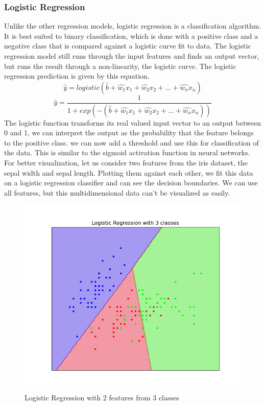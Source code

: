 \documentclass{article}
\begin{document}
\subsubsection{Logistic Regression}
Unlike the other regression models, logistic regression is a classification algorithm. It is best suited to binary classification, which is done with a positive class and a negative class that is compared against a logistic curve fit to data. The logistic regression model still runs through the input features and finds an output vector, but runs the result through a non-linearity, the logistic curve. The logistic regression prediction is given by this equation.
$$\hat{y} = logistic(\hat{b} + \hat{w_1}x_1 + \hat{w_2}x_2 + ... + \hat{w_n}x_n)$$
$$\hat{y} = \frac{1}{1+exp(-(\hat{b} + \hat{w_1}x_1 + \hat{w_2}x_2 + ... + \hat{w_n}x_n))}$$
The logistic function transforms its real valued input vector to an output between 0 and 1, we can interpret the output as the probability that the feature belongs to the positive class. we can now add a threshold and use this for classification of the data. This is similar to the sigmoid activation function in neural networks. For better visualization, let us consider two features from the iris dataset, the sepal width and sepal length. Plotting them against each other, we fit this data on a logistic regression classifier and can see the decision boundaries. We can use all features, but this multidimensional data can't be visualized as easily.

\begin{figure}[H]
\includegraphics[width=0.7\linewidth]{Images/log_reg.png}
\centering
\caption{Logistic Regression with 2 features from 3 classes}
\end{figure}
\end{document}
